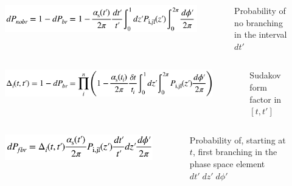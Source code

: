 \documentclass[aspectratio=43]{beamer}
\begin{document}
\begin{frame}
\begin{columns}
		
		\begin{figure}
			\includegraphics[width = 5.5 cm]{plots/probability3.png}
		\end{figure}
		
		
		\footnotesize Probability of no branching in the interval $dt'$
	
	\end{columns}

	\begin{columns} 
	
	
	\begin{figure}
		\includegraphics[width = 6 cm]{plots/probability4.png}
	\end{figure}
	
	
	\footnotesize Sudakov form factor in $[t, t']$
	
	\end{columns}
	
	\begin{columns} 
		
		\column{0.4\textwidth}
		
		\begin{figure}
			\includegraphics[width = 4.5 cm]{plots/probability5.png}
		\end{figure}
		
		\column{0.6\textwidth}
		
		\footnotesize Probability of, starting at $t$, first branching in the phase space element $dt'\; dz'\; d\phi'$
		
	\end{columns}

\end{frame}
\end{document}
